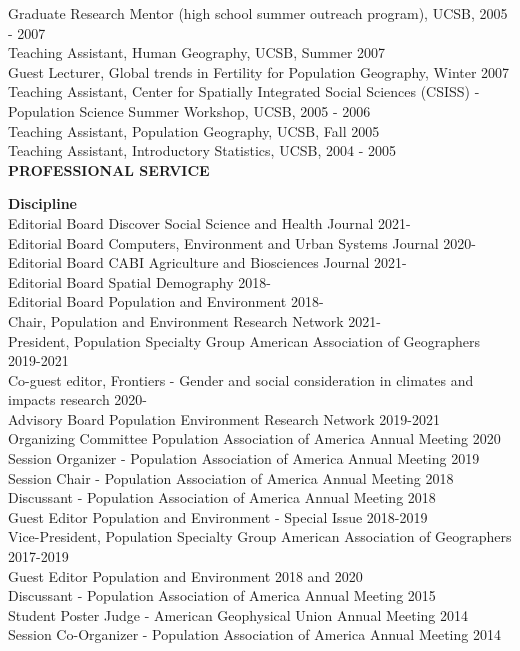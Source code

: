 \documentclass[11pt]{article} %
\begin{document}
Graduate Research Mentor (high school summer outreach program), UCSB, 2005 - 2007\\
Teaching Assistant, Human Geography, UCSB, Summer 2007\\
Guest Lecturer, Global trends in Fertility for Population Geography, Winter 2007\\
Teaching Assistant, Center for Spatially Integrated Social Sciences (CSISS) -  Population Science Summer Workshop, UCSB, 2005 - 2006\\
Teaching Assistant, Population Geography, UCSB, Fall 2005\\
Teaching Assistant, Introductory Statistics, UCSB, 2004 - 2005\\





\vspace{.5cm}
\noindent
{\large \textbf{PROFESSIONAL SERVICE}}
\vspace{.5cm}

\noindent

\noindent
\textbf{Discipline}\\
Editorial Board Discover Social Science and Health Journal 2021-\\
Editorial Board Computers, Environment and Urban Systems Journal 2020-\\
Editorial Board CABI Agriculture and Biosciences Journal 2021-\\
Editorial Board Spatial Demography 2018-\\
Editorial Board Population and Environment 2018-\\
Chair, Population and Environment Research Network 2021-\\
President, Population Specialty Group American Association of Geographers 2019-2021\\
Co-guest editor, Frontiers - Gender and social consideration in climates and impacts research 2020-\\
Advisory Board Population Environment Research Network 2019-2021\\
Organizing Committee Population Association of America Annual Meeting 2020\\
Session Organizer - Population Association of America Annual Meeting 2019 \\
Session Chair - Population Association of America Annual Meeting 2018\\
Discussant - Population Association of America Annual Meeting 2018\\
Guest Editor Population and Environment - Special Issue 2018-2019\\
Vice-President, Population Specialty Group American Association of Geographers 2017-2019\\
Guest Editor Population and Environment 2018 and 2020\\
Discussant - Population Association of America Annual Meeting 2015\\
Student Poster Judge - American Geophysical Union Annual Meeting 2014\\
Session Co-Organizer - Population Association of America Annual Meeting 2014 \\
\end{document}
